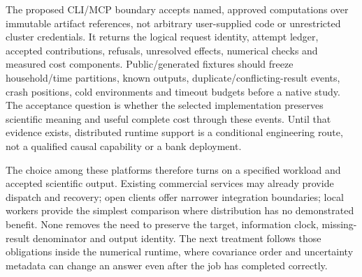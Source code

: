 The proposed CLI/MCP boundary accepts named, approved computations over immutable artifact references, not arbitrary user-supplied code or unrestricted cluster credentials. It returns the logical request identity, attempt ledger, accepted contributions, refusals, unresolved effects, numerical checks and measured cost components. Public/generated fixtures should freeze household/time partitions, known outputs, duplicate/conflicting-result events, crash positions, cold environments and timeout budgets before a native study. The acceptance question is whether the selected implementation preserves scientific meaning and useful complete cost through these events. Until that evidence exists, distributed runtime support is a conditional engineering route, not a qualified causal capability or a bank deployment.~\citep{exec24_ray_contract}

The choice among these platforms therefore turns on a specified workload and accepted scientific output. Existing commercial services may already provide dispatch and recovery; open clients offer narrower integration boundaries; local workers provide the simplest comparison where distribution has no demonstrated benefit. None removes the need to preserve the target, information clock, missing-result denominator and output identity. The next treatment follows those obligations inside the numerical runtime, where covariance order and uncertainty metadata can change an answer even after the job has completed correctly.

